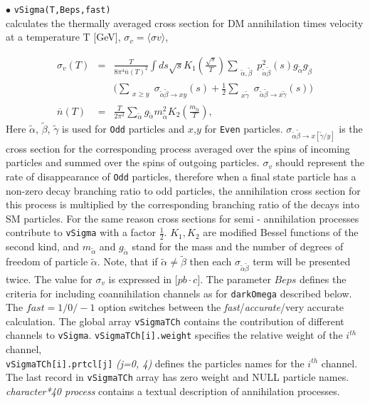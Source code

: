\documentclass[12pt,a4paper]{article}
\begin{document}
\noindent
$\bullet$ \verb|vSigma(T,Beps,fast)|\\
calculates the thermally averaged cross section for DM annihilation  times velocity  
at a  temperature T [GeV], $\sigma_v=\langle\sigma v\rangle$,

\begin{eqnarray}
\nonumber
\sigma_v(T) &=& \frac{T}{8\pi^4  \overline{n}(T)^2} \int ds\sqrt{s} K_1\left(\frac{\sqrt{s}}{T}\right)   
\sum_{\substack{
\tilde\alpha ,\tilde\beta }}  p_{\tilde\alpha\tilde\beta}^2(s) g_{\tilde\alpha} g_{\tilde\beta} \\
&&\big(
\sum_{\substack{ x \ge y }}  
 {\sigma}_{\tilde\alpha\tilde\beta\to x y}(s)+ \frac{1}{2}\sum_{\substack{x  \tilde\gamma }}
 {\sigma}_{\tilde\alpha\tilde\beta\to x\tilde\gamma}(s)
  \big)
\label{sigmaV}\\
\overline{n}(T)&=&\frac{T}{2\pi^2 } \sum_{\tilde\alpha} g_{\tilde\alpha} m^2_{\tilde\alpha} K_2(\frac{m_{\tilde\alpha}}{T}),
\end{eqnarray}
Here  $\tilde\alpha$, $\tilde\beta$, $\tilde\gamma$  is used for  {\tt Odd} particles and $x$,$y$
for {\tt Even}  particles.    ${\sigma}_{\tilde\alpha\tilde\beta\to x[\tilde\gamma/y]} $ is the cross section for the 
corresponding  process  averaged over the spins of incoming particles and summed
over the spins of outgoing particles. $\sigma_v$  should represent the rate of disappearance  of  {\tt Odd} particles, therefore
when a final state particle has a non-zero decay branching ratio to odd particles, the  annihilation cross section for this process is multiplied by the corresponding branching ratio of the decays into SM particles. For the same reason cross sections for  semi - annihilation processes  contribute to {\tt vSigma} with a factor $\frac{1}{2}$. $K_1,K_2$ are modified Bessel functions of the second kind, and 
$m_{\tilde\alpha}$ and $g_{\tilde\alpha}$ stand for the  mass and the number of degrees of freedom of particle $\tilde\alpha$.
Note, that if $\tilde\alpha \ne \tilde\beta$ then each
${\sigma}_{\tilde\alpha\tilde\beta}$ term will be presented  twice.
The value for $\sigma_v$ 
is expressed in [$pb\cdot c$].  The parameter $Beps$ defines the criteria for including coannihilation
channels as for {\tt darkOmega} described below.
The $fast=1/0/-1$ option switches between the {\it fast}/{\it accurate}/{very accurate} calculation. 
The global array {\tt vSigmaTCh} contains the 
contribution of different channels to {\tt vSigma}. \verb|vSigmaTCh[i].weight| specifies the relative
weight of the $i^{th}$ channel, \\
\verb|vSigmaTCh[i].prtcl[j]|  {\it (j=0, 4)}  defines the particles names for the $i^{th}$
channel.\\
The last record in \verb|vSigmaTCh| array has zero weight and 
NULL particle names.  {\it character*40  process}
contains a textual description of annihilation processes.\\
\end{document}
